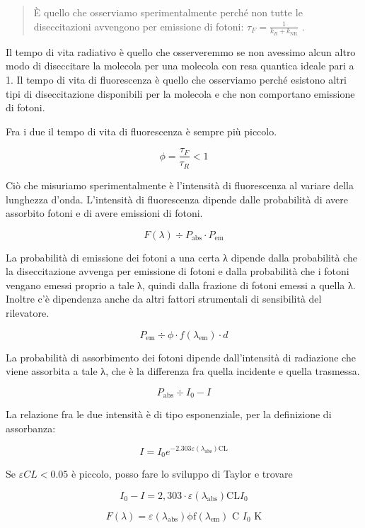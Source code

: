 \begin{quote}
È quello che osserviamo sperimentalmente perché non tutte le
diseccitazioni avvengono per emissione di fotoni:
\(\tau_{F} = \frac{1}{k_{R} + k_{\text{NR}}}\) .
\end{quote}

Il tempo di vita radiativo è quello che osserveremmo se non avessimo
alcun altro modo di diseccitare la molecola per una molecola con resa
quantica ideale pari a 1. Il tempo di vita di fluorescenza è quello che
osserviamo perché esistono altri tipi di diseccitazione disponibili per
la molecola e che non comportano emissione di fotoni.

Fra i due il tempo di vita di fluorescenza è sempre più piccolo.

\[\phi = \frac{\tau_{F}}{\tau_{R}} < 1\]

Ciò che misuriamo sperimentalmente è l'intensità di fluorescenza al
variare della lunghezza d'onda. L'intensità di fluorescenza dipende
dalle probabilità di avere assorbito fotoni e di avere emissioni di
fotoni.

\[F\left( \lambda \right) \div P_{\text{abs}} \cdot P_{\text{em}}\]

La probabilità di emissione dei fotoni a una certa λ dipende dalla
probabilità che la diseccitazione avvenga per emissione di fotoni e
dalla probabilità che i fotoni vengano emessi proprio a tale λ, quindi
dalla frazione di fotoni emessi a quella λ. Inoltre c'è dipendenza anche
da altri fattori strumentali di sensibilità del rilevatore.

\[P_{\text{em}} \div \phi \cdot f\left( \lambda_{\text{em}} \right) \cdot d\]

La probabilità di assorbimento dei fotoni dipende dall'intensità di
radiazione che viene assorbita a tale λ, che è la differenza fra quella
incidente e quella trasmessa.

\[P_{\text{abs}} \div I_{0} - I\]

La relazione fra le due intensità è di tipo esponenziale, per la
definizione di assorbanza:

\[I = I_{0}e^{- 2.303\varepsilon\left( \lambda_{\text{abs}} \right)\text{CL}}\]

Se \(\varepsilon CL < 0.05\) è piccolo, posso fare lo sviluppo di Taylor
e trovare

\[I_{0} - I = 2,303 \cdot \varepsilon\left( \lambda_{\text{abs}} \right)\text{CL}I_{0}\]

\[F\left( \lambda \right) = \varepsilon\left( \lambda_{\text{abs}} \right)\text{ϕf}\left( \lambda_{\text{em}} \right)\text{\ C\ }I_{0}\text{\ K}\]

